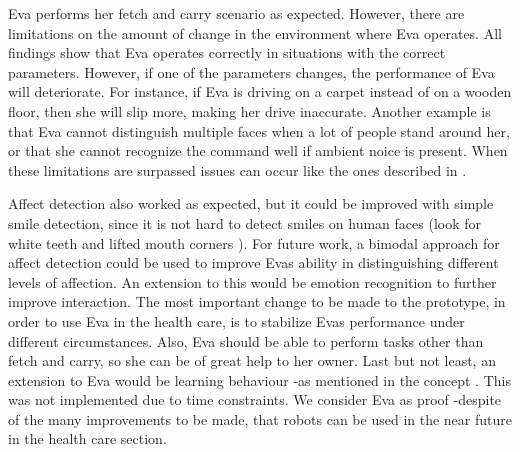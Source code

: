 \documentclass[project_eva.tex]{subfiles}
\begin{document}
Eva performs her fetch and carry scenario as expected. However, there are limitations on the amount of change in the 
environment where Eva operates. All findings show that Eva operates correctly in situations with the correct 
parameters. However, if one of the parameters changes, the performance of Eva will deteriorate. For instance, if Eva is 
driving on a carpet instead of on a wooden floor, then she will slip more, making her drive inaccurate. Another example 
is that Eva cannot distinguish multiple faces when a lot of people stand around her, or that she cannot recognize the 
command well if ambient noice is present. When these limitations are surpassed issues can occur like the ones described 
in \pageref{simulation} .

Affect detection also worked as expected, but it could be improved with simple smile detection, since it is not hard to 
detect smiles on human faces (look for white teeth and lifted mouth corners \cite{autosmiley} \cite{smile} ). For future work, a bimodal approach \cite{bimodal} for affect detection could be used to improve Eva\textquotesingle s ability in 
distinguishing different levels of affection. An extension to this would be emotion recognition to further improve 
interaction. The most important change to be made to the prototype, in order to use Eva in the health care, is to stabilize Eva\textquotesingle s performance under different circumstances. Also, Eva should be able to perform tasks other than fetch and carry, so she can be of great help to her owner. Last but not least, an extension to Eva would be learning behaviour -as mentioned in the concept \pageref{concept} . This was not implemented due to time constraints. We consider Eva as proof -despite of the many improvements to be made, that robots can be used in the near future in the health care section.
\end{document}
